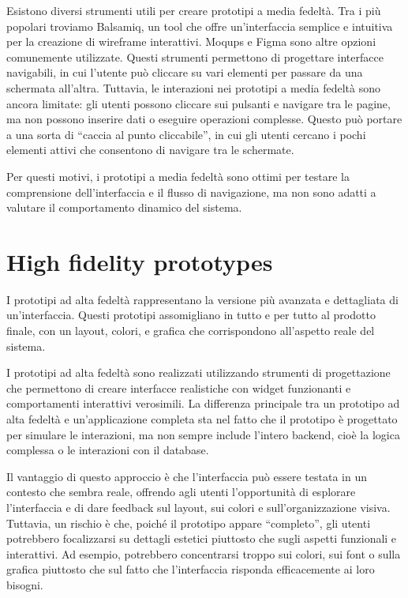 Esistono diversi strumenti utili per creare prototipi a media fedeltà. Tra i più popolari troviamo Balsamiq, un tool che offre un'interfaccia semplice e intuitiva per la creazione di wireframe interattivi. Moqups e Figma sono altre opzioni comunemente utilizzate.
Questi strumenti permettono di progettare interfacce navigabili, in cui l'utente può cliccare su vari elementi per passare da una schermata all'altra. Tuttavia, le interazioni nei prototipi a media fedeltà sono ancora limitate: gli utenti possono cliccare sui pulsanti e navigare tra le pagine, ma non possono inserire dati o eseguire operazioni complesse.
Questo può portare a una sorta di “caccia al punto cliccabile”, in cui gli utenti cercano i pochi elementi attivi che consentono di navigare tra le schermate.

Per questi motivi, i prototipi a media fedeltà sono ottimi per testare la comprensione dell'interfaccia e il flusso di navigazione, ma non sono adatti a valutare il comportamento dinamico del sistema.

\section{High fidelity prototypes}
I prototipi ad alta fedeltà rappresentano la versione più avanzata e dettagliata di un'interfaccia. Questi prototipi assomigliano in tutto e per tutto al prodotto finale, con un layout, colori, e grafica che corrispondono all'aspetto reale del sistema.

I prototipi ad alta fedeltà sono realizzati utilizzando strumenti di progettazione che permettono di creare interfacce realistiche con widget funzionanti e comportamenti interattivi verosimili. La differenza principale tra un prototipo ad alta fedeltà e un'applicazione completa sta nel fatto che il prototipo è progettato per simulare le interazioni, ma non sempre include l'intero backend, cioè la logica complessa o le interazioni con il database.

Il vantaggio di questo approccio è che l'interfaccia può essere testata in un contesto che sembra reale, offrendo agli utenti l'opportunità di esplorare l'interfaccia e di dare feedback sul layout, sui colori e sull'organizzazione visiva. Tuttavia, un rischio è che, poiché il prototipo appare “completo”, gli utenti potrebbero focalizzarsi su dettagli estetici piuttosto che sugli aspetti funzionali e interattivi. Ad esempio, potrebbero concentrarsi troppo sui colori, sui font o sulla grafica piuttosto che sul fatto che l’interfaccia risponda efficacemente ai loro bisogni.

